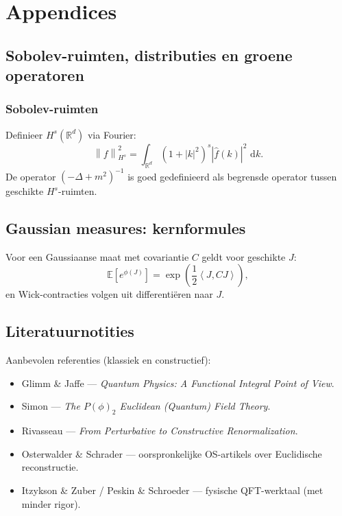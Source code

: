\documentclass[11pt,a4paper,oneside]{book}
\theoremstyle{plain}
\theoremstyle{definition}
\newcommand{\R}{\mathbb{R}}
\renewcommand{\dd}{\,\mathrm{d}}
\newcommand{\EE}{\mathbb{E}}
\newcommand{\inner}[2]{\left\langle #1, #2\right\rangle}
\newcommand{\normH}[1]{\left\lVert #1\right\rVert}
\begin{document}
	\part{Appendices}
	
	\chapter{Sobolev-ruimten, distributies en groene operatoren}
	
	\section{Sobolev-ruimten}
	Definieer $H^s(\R^d)$ via Fourier:
	\[
	\normH{f}_{H^s}^2=\int_{\R^d}(1+|k|^2)^s|\hat f(k)|^2\,\dd k.
	\]
	De operator $(-\Delta+m^2)^{-1}$ is goed gedefinieerd als begrensde operator tussen geschikte $H^s$-ruimten.
	
	\chapter{Gaussian measures: kernformules}
	Voor een Gaussiaanse maat met covariantie $C$ geldt voor geschikte $J$:
	\[
	\EE\left[e^{\phi(J)}\right]=\exp\left(\frac12 \inner{J}{CJ}\right),
	\]
	en Wick-contracties volgen uit differentiëren naar $J$.
	
	\backmatter
	\chapter*{Literatuurnotities}
	
	Aanbevolen referenties (klassiek en constructief):
	\begin{itemize}[leftmargin=*]
		\item Glimm \& Jaffe — \emph{Quantum Physics: A Functional Integral Point of View}.
		\item Simon — \emph{The $P(\phi)_2$ Euclidean (Quantum) Field Theory}.
		\item Rivasseau — \emph{From Perturbative to Constructive Renormalization}.
		\item Osterwalder \& Schrader — oorspronkelijke OS-artikels over Euclidische reconstructie.
		\item Itzykson \& Zuber / Peskin \& Schroeder — fysische QFT-werktaal (met minder rigor).
	\end{itemize}
	
\end{document}
